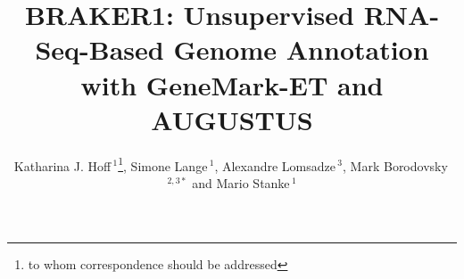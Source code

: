 \documentclass{bioinfo}
\begin{document}

\title[BRAKER1]{BRAKER1: Unsupervised RNA-Seq-Based Genome Annotation with GeneMark-ET and AUGUSTUS}
\author[Hoff \textit{et~al}]{Katharina J. Hoff\,$^{1}$\footnote{to whom correspondence should be addressed}, Simone Lange\,$^{1}$, Alexandre Lomsadze\,$^{3}$, Mark Borodovsky\,$^{2,3*}$ and Mario Stanke\,$^1$}
\address{$^{1}$Ernst Moritz Arndt Universit\"{a}t Greifswald, Institute for Mathematics and Computer Science, Walther-Rathenau-Stra\ss{}e 47, 17487 Greifswald, Germany\\
$^{2}$School of Computational Science and Engineering\\
$^{3}$Joint Georgia Tech and Emory University Wallace H Coulter Department of Biomedical Engineering, Atlanta, GA 30332, USA}



\maketitle
\end{document}
